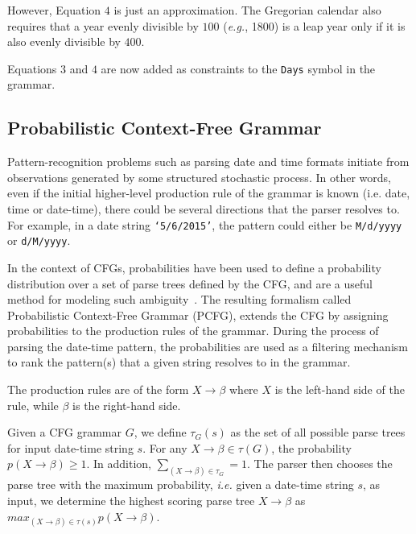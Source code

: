 However, Equation $4$ is just an approximation. The Gregorian calendar also requires that a year evenly divisible by $100$ (\textit{e.g.}, 1800) is a leap year only if it is also evenly divisible by $400$. 

Equations $3$ and $4$ are now added as constraints to the \texttt{Days} symbol in the grammar.

\subsection{Probabilistic Context-Free Grammar}

Pattern-recognition problems such as parsing date and time formats initiate from observations generated by some structured stochastic process. In other words, even if the initial higher-level production rule of the grammar is known (i.e. date, time or date-time), there could be several directions that the parser resolves to. For example, in a date string \texttt{`5/6/2015'}, the pattern could either be \texttt{M/d/yyyy} or \texttt{d/M/yyyy}. 

In the context of CFGs, probabilities have been used to define a probability distribution over a set of parse trees defined by the CFG, and are a useful method for modeling such ambiguity~\cite{Collins:2003,Manning:1999}. The resulting formalism called Probabilistic Context-Free Grammar (PCFG), extends the CFG by assigning probabilities to the production rules of the grammar. During the process of parsing the date-time pattern, the probabilities are used as a filtering mechanism to rank the pattern(s) that a given string resolves to in the grammar. 

The production rules are of the form $ X \rightarrow \beta$ where $X$ is the left-hand side of the rule, while $\beta$ is the right-hand side.

Given a CFG grammar $G$, we define  $\tau_G(s)$ as the set of all possible parse trees for input date-time string $s$.  For any $X \rightarrow \beta \in \tau(G)$, the probability $p(X \rightarrow \beta) \ge 1$. In addition, $\sum_{(X \rightarrow \beta) \in \tau_{G}} = 1$. The parser then chooses the parse tree with the maximum probability, \textit{i.e.} given a date-time string $s$, as input, we determine the highest scoring parse tree $X \rightarrow \beta$ as  $max_{(X \rightarrow \beta) \in \tau(s)} p(X \rightarrow \beta)$.

